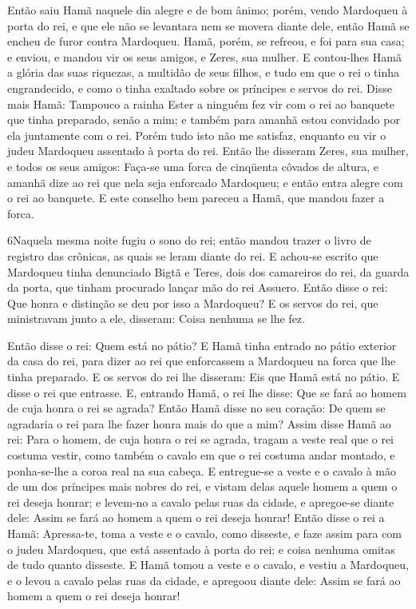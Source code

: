 Então saiu Hamã naquele dia alegre e de bom ânimo; porém, vendo
Mardoqueu à porta do rei, e que ele não se levantara nem se movera
diante dele, então Hamã se encheu de furor contra Mardoqueu.
Hamã, porém, se refreou, e foi para sua casa; e enviou, e
mandou vir os seus amigos, e Zeres, sua mulher. E contou-lhes
Hamã a glória das suas riquezas, a multidão de seus filhos, e tudo
em que o rei o tinha engrandecido, e como o tinha exaltado sobre os
príncipes e servos do rei. Disse mais Hamã: Tampouco a rainha
Ester a ninguém fez vir com o rei ao banquete que tinha preparado,
senão a mim; e também para amanhã estou convidado por ela juntamente
com o rei. Porém tudo isto não me satisfaz, enquanto eu vir o
judeu Mardoqueu assentado à porta do rei. Então lhe disseram
Zeres, sua mulher, e todos os seus amigos: Faça-se uma forca de
cinqüenta côvados de altura, e amanhã dize ao rei que nela seja
enforcado Mardoqueu; e então entra alegre com o rei ao banquete. E
este conselho bem pareceu a Hamã, que mandou fazer a forca.

\medskip

\lettrine{6} Naquela mesma noite fugiu o sono do rei; então
mandou trazer o livro de registro das crônicas, as quais se leram
diante do rei. E achou-se escrito que Mardoqueu tinha denunciado
Bigtã e Teres, dois dos camareiros do rei, da guarda da porta, que
tinham procurado lançar mão do rei Assuero. Então disse o rei:
Que honra e distinção se deu por isso a Mardoqueu? E os servos do
rei, que ministravam junto a ele, disseram: Coisa nenhuma se lhe
fez.

Então disse o rei: Quem está no pátio? E Hamã tinha entrado no
pátio exterior da casa do rei, para dizer ao rei que enforcassem a
Mardoqueu na forca que lhe tinha preparado. E os servos do rei
lhe disseram: Eis que Hamã está no pátio. E disse o rei que
entrasse. E, entrando Hamã, o rei lhe disse: Que se fará ao
homem de cuja honra o rei se agrada? Então Hamã disse no seu
coração: De quem se agradaria o rei para lhe fazer honra mais do que
a mim? Assim disse Hamã ao rei: Para o homem, de cuja honra o
rei se agrada, tragam a veste real que o rei costuma vestir,
como também o cavalo em que o rei costuma andar montado, e
ponha-se-lhe a coroa real na sua cabeça. E entregue-se a veste e
o cavalo à mão de um dos príncipes mais nobres do rei, e vistam
delas aquele homem a quem o rei deseja honrar; e levem-no a cavalo
pelas ruas da cidade, e apregoe-se diante dele: Assim se fará ao
homem a quem o rei deseja honrar! Então disse o rei a Hamã:
Apressa-te, toma a veste e o cavalo, como disseste, e faze assim
para com o judeu Mardoqueu, que está assentado à porta do rei; e
coisa nenhuma omitas de tudo quanto disseste. E Hamã tomou a
veste e o cavalo, e vestiu a Mardoqueu, e o levou a cavalo pelas
ruas da cidade, e apregoou diante dele: Assim se fará ao homem a
quem o rei deseja honrar!

